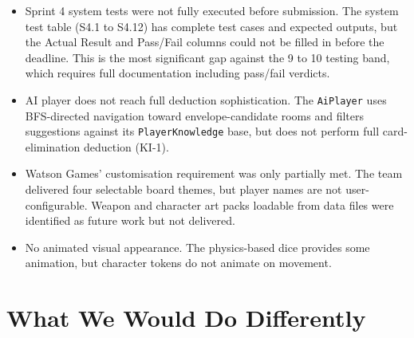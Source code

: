 \begin{itemize}
    \item Sprint 4 system tests were not fully executed before submission. The system test table (S4.1 to S4.12) has complete test cases and expected outputs, but the Actual Result and Pass/Fail columns could not be filled in before the deadline. This is the most significant gap against the 9 to 10 testing band, which requires full documentation including pass/fail verdicts.
    \item AI player does not reach full deduction sophistication. The \texttt{AiPlayer} uses BFS-directed navigation toward envelope-candidate rooms and filters suggestions against its \texttt{PlayerKnowledge} base, but does not perform full card-elimination deduction (KI-1).
    \item Watson Games' customisation requirement was only partially met. The team delivered four selectable board themes, but player names are not user-configurable. Weapon and character art packs loadable from data files were identified as future work but not delivered.
    \item No animated visual appearance. The physics-based dice provides some animation, but character tokens do not animate on movement.
\end{itemize}

\section{What We Would Do Differently}

